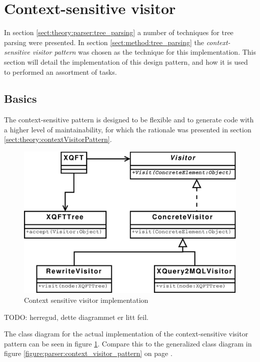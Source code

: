 \section{Context-sensitive visitor}
\label{sect:impl:context_sens_visitor}
In section \ref{sect:theory:parser:tree_parsing} a number of techniques for
tree parsing were presented. In section \ref{sect:method:tree_parsing} the
\textit{context-sensitive visitor pattern} was chosen as the technique for this
implementation. This section will detail the implementation of this design
pattern, and how it is used to performed an assortment of tasks.

\subsection{Basics}
The context-sensitive pattern is designed to be flexible and to generate code
with a higher level of maintainability, for which the rationale was presented
in section \ref{sect:theory:contextVisitorPattern}. 

\begin{figure}[htp]
\begin{center}
  \includegraphics[scale=0.5]{diagrams/context_visitor_pattern_impl}
  \caption{Context sensitive visitor implementation}
  \label{fig:impl:context_sens_visitor_impl}
\end{center}
\end{figure}

TODO: herregud, dette diagrammet er litt feil.

The class diagram for the actual implementation of the context-sensitive
visitor pattern can be seen in figure \ref{fig:impl:context_sens_visitor_impl}.
Compare this to the generalized class diagram in figure
\ref{figure:parser:context_visitor_pattern} on page
\pageref{figure:parser:context_visitor_pattern}.

